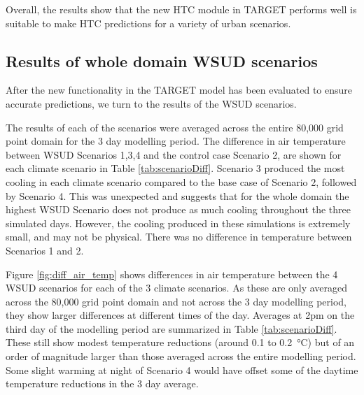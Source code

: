 \documentclass[final,3p,times,authoryear]{elsarticle}
\begin{document}
Overall, the results show that the new HTC module in TARGET performs well is suitable to make HTC predictions for a variety of urban scenarios.

\subsection{Results of whole domain WSUD scenarios}\label{sec:whole_domain}
After the new functionality in the TARGET model has been evaluated to ensure accurate predictions, we turn to the results of the WSUD scenarios. 

The results of each of the scenarios were averaged across the entire 80,000 grid point domain for the 3 day modelling period. The difference in air temperature between WSUD Scenarios 1,3,4 and the control case Scenario 2, are shown for each climate scenario in Table \ref{tab:scenarioDiff}. Scenario 3 produced the most cooling in each climate scenario compared to the base case of Scenario 2, followed by Scenario 4. This was unexpected and suggests that for the whole domain the highest WSUD Scenario does not produce as much cooling throughout the three simulated days. However, the cooling produced in these simulations is extremely small, and may not be physical. There was no difference in temperature between Scenarios 1 and 2. 

Figure \ref{fig:diff_air_temp} shows differences in air temperature between the 4 WSUD scenarios for each of the 3 climate scenarios. As these are only averaged across the 80,000 grid point domain and not across the 3 day modelling period, they show larger differences at different times of the day. Averages at 2pm on the third day of the modelling period are summarized in Table \ref{tab:scenarioDiff}. These still show modest temperature reductions (around 0.1 to 0.2\SI{}{\degreeCelsius}) but of an order of magnitude larger than those averaged across the entire modelling period. Some slight warming at night of Scenario 4 would have offset some of the daytime temperature reductions in the 3 day average.
\end{document}
